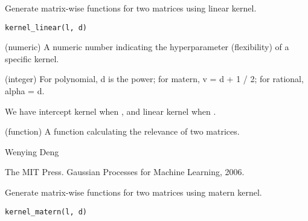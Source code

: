 \documentclass[a4paper]{book}
\begin{document}
%
\begin{Description}\relax
Generate matrix-wise functions for two matrices using linear kernel.
\end{Description}
%
\begin{Usage}
\begin{verbatim}
kernel_linear(l, d)
\end{verbatim}
\end{Usage}
%
\begin{Arguments}
\begin{ldescription}
\item[\code{l}] (numeric) A numeric number indicating the hyperparameter
(flexibility) of a specific kernel.

\item[\code{d}] (integer) For polynomial, d is the power; for matern, v = d + 1 /
2; for rational, alpha = d.
\end{ldescription}
\end{Arguments}
%
\begin{Details}\relax
{}  We have intercept
kernel when , and linear kernel when .
\end{Details}
%
\begin{Value}
\begin{ldescription}
\item[\code{matrix\_wise}] (function) A function calculating the relevance
of two matrices.
\end{ldescription}
\end{Value}
%
\begin{Author}\relax
Wenying Deng
\end{Author}
%
\begin{References}\relax
The MIT Press. Gaussian Processes for Machine Learning, 2006.
\end{References}
%
\begin{Description}\relax
Generate matrix-wise functions for two matrices using matern kernel.
\end{Description}
%
\begin{Usage}
\begin{verbatim}
kernel_matern(l, d)
\end{verbatim}
\end{Usage}
\end{document}
